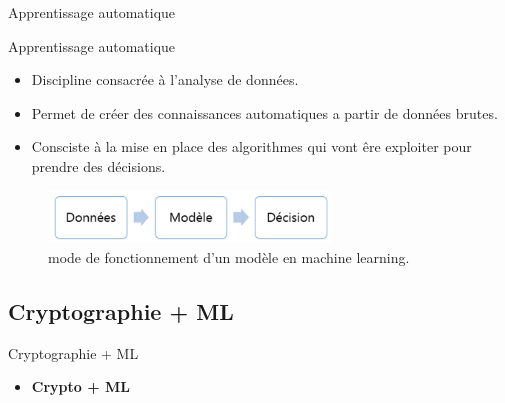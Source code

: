 \documentclass{beamer}
\begin{document}
  \begin{frame}{Apprentissage automatique}
  \begin{block}{Apprentissage automatique}
  \begin{itemize}
    \item{Discipline consacrée à l'analyse de données.}
  	\item{Permet de créer des connaissances automatiques a partir de données brutes.}
    \item{Consciste à la mise en place des algorithmes qui vont êre exploiter pour prendre des décisions.}
  \end{itemize}
  \end{block}
  \begin{figure}[h!]\begin{center}
            \includegraphics[width=7.5cm]{m_learning.png}
            \caption{mode de fonctionnement d'un modèle en machine learning.}
          \end{center}
        \end{figure}
    \end{frame}
  \subsection{Cryptographie + ML}
  

  \begin{frame}{Cryptographie + ML}

    \begin{itemize}
    \item<1-> {
      \textbf{Crypto + ML}\\
       \\
              }
  \end{itemize}
  \end{frame}
\end{document}
